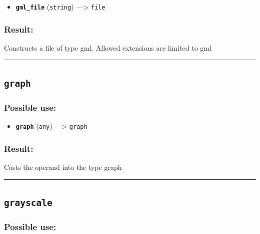 \documentclass[]{book}
\providecommand{\tightlist}{%
  \setlength{\itemsep}{0pt}\setlength{\parskip}{0pt}}
\theoremstyle{definition}
\theoremstyle{definition}
\theoremstyle{definition}
\theoremstyle{remark}
\begin{document}
\begin{itemize}
\tightlist
\item
  \textbf{\texttt{gml\_file}} (\texttt{string}) ---\textgreater{}
  \texttt{file}
\end{itemize}

\subsubsection{Result:}\label{result-229}

Constructs a file of type gml. Allowed extensions are limited to gml

\begin{center}\rule{0.5\linewidth}{\linethickness}\end{center}

\subsection{\texorpdfstring{\texttt{graph}}{graph}}\label{graph}

\subsubsection{Possible use:}\label{possible-use-239}

\begin{itemize}
\tightlist
\item
  \textbf{\texttt{graph}} (\texttt{any}) ---\textgreater{}
  \texttt{graph}
\end{itemize}

\subsubsection{Result:}\label{result-230}

Casts the operand into the type graph

\begin{center}\rule{0.5\linewidth}{\linethickness}\end{center}

\subsection{\texorpdfstring{\texttt{grayscale}}{grayscale}}\label{grayscale}

\subsubsection{Possible use:}\label{possible-use-240}
\end{document}
